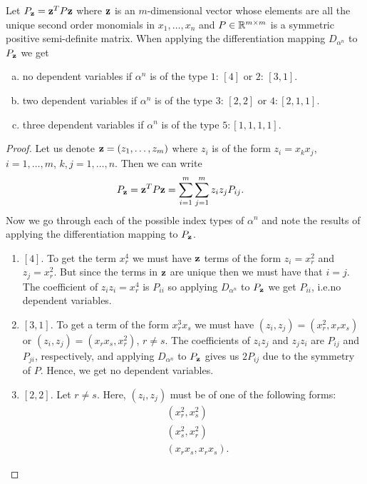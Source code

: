 \documentclass[a4paper,12pt,twoside,BCOR=10mm]{scrbook}
\begin{document}
\begin{theorem}\label{Thm dependent variables in relations}
Let $P_{\mathbf{z}} = \mathbf{z}^T P\mathbf{z}$ where $\mathbf{z}$ is an $m$-dimensional vector whose elements are all the unique second order monomials in $x_1, \dots, x_n$ and $P\in \mathbb{R}^{m \times m}$ is a symmetric positive semi-definite matrix.
When applying the differentiation mapping $D_{\alpha^n}$ to $P_{\mathbf{z}}$ we get
\begin{enumerate}[a)]
    \item no dependent variables if $\alpha^n$ is of the type $1:\, [4]$ or $2:\, [3,1]$.
    \item two dependent variables if $\alpha^n$ is of the type $3:\, [2,2]$ or $4: [2,1,1]$.
    \item three dependent variables if $\alpha^n$ is of the type $5: [1,1,1,1]$.
\end{enumerate}
\begin{proof}
Let us denote $\mathbf{z} = (z_1, \ldots, z_m)$ where $z_i$ is of the form $z_i = x_kx_j$, $i = 1, \ldots, m$, $k,j = 1, \ldots, n$. Then we can write
\begin{align*}
    P_{\mathbf{z}} &= \mathbf{z}^T P \mathbf{z} = \sum\limits_{i = 1}^m\sum\limits_{j = 1}^m z_iz_jP_{ij}.
\end{align*}
Now we go through each of the possible index types of $\alpha^n$ and note the results of applying the differentiation mapping to $P_{\mathbf{z}}$.
\begin{enumerate}[1:]
    \item $[4]$. To get the term $x_r^4$ we must have $\mathbf{z}$ terms of the form $z_i = x_r^2$ and $z_j = x_r^2$. But since the terms in $\mathbf{z}$ are unique then we must have that $i = j$. The coefficient of $z_iz_i = x_r^4$ is $P_{ii}$ so applying $D_{\alpha^n}$ to $P_{\mathbf{z}}$ we get $P_{ii}$, i.e.\@ no dependent variables.
    \item $[3,1]$. To get a term of the form $x_r^3x_s$ we must have $(z_i, z_j) = (x_r^2, x_rx_s)$ or $(z_i, z_j) = (x_rx_s, x_r^2)$, $r \neq s$. The coefficients of $z_iz_j$ and $z_jz_i$ are $P_{ij}$ and $P_{ji}$, respectively, and applying $D_{\alpha^n}$ to $P_{\mathbf{z}}$ gives us $2P_{ij}$ due to the symmetry of $P$. Hence, we get no dependent variables.
    \item $[2,2]$. Let $r \neq s$. Here, $(z_i,z_j)$ must be of one of the following forms:
        \begin{align*}
            &(x_r^2, x_s^2)\\
            &(x_s^2, x_r^2)\\
            &(x_rx_s, x_rx_s).
        \end{align*}

\end{enumerate}
\end{proof}
\end{theorem}
\end{document}
